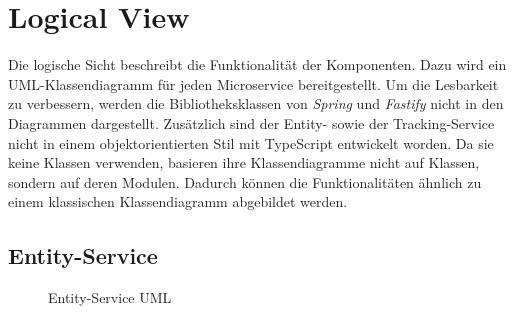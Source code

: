 \section{Logical View}
Die logische Sicht beschreibt die Funktionalität der Komponenten.
Dazu wird ein UML-Klassendiagramm für jeden Microservice bereitgestellt.
Um die Lesbarkeit zu verbessern, werden die Bibliotheksklassen von \textit{Spring} und \textit{Fastify} nicht in den Diagrammen dargestellt.
Zusätzlich sind der Entity- sowie der Tracking-Service nicht in einem objektorientierten Stil mit TypeScript entwickelt worden.
Da sie keine Klassen verwenden, basieren ihre Klassendiagramme nicht auf Klassen, sondern auf deren Modulen.
Dadurch können die Funktionalitäten ähnlich zu einem klassischen Klassendiagramm abgebildet werden.

\subsection{Entity-Service}
\begin{figure}[!ht]
    \centering
    \caption{Entity-Service UML}
    \label{fig:entity-service}
\end{figure}

